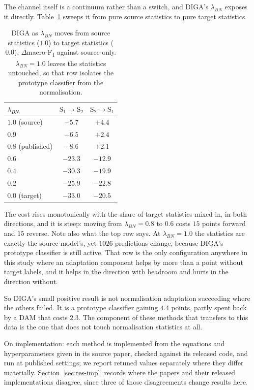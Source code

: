 \documentclass[a4paper,fleqn]{cas-dc}
\newcommand{\macf}{macro-F\textsubscript{1}}
\begin{document}
The channel itself is a continuum rather than a switch, and DIGA's $\lambda_{BN}$ exposes
it directly. Table~\ref{tab:bndial} sweeps it from pure source statistics to pure target
statistics.

\begin{table}[t]
\centering
\caption{DIGA as $\lambda_{BN}$ moves from source statistics ($1.0$) to target statistics
($0.0$), $\Delta$\macf{} against source-only. $\lambda_{BN}=1.0$ leaves the statistics
untouched, so that row isolates the prototype classifier from the normalisation.}
\label{tab:bndial}
\small
\begin{tabular}{@{}lcc@{}}
\toprule
$\lambda_{BN}$ & $\text{S}_1\!\to\!\text{S}_2$ & $\text{S}_2\!\to\!\text{S}_1$ \\
\midrule
$1.0$ (source) & $-5.7$ & $\mathbf{+4.4}$ \\
$0.9$          & $-6.5$ & $+2.4$ \\
$0.8$ (published) & $-8.6$ & $+2.1$ \\
$0.6$          & $-23.3$ & $-12.9$ \\
$0.4$          & $-30.3$ & $-19.9$ \\
$0.2$          & $-25.9$ & $-22.8$ \\
$0.0$ (target) & $-33.0$ & $-20.5$ \\
\bottomrule
\end{tabular}
\end{table}

The cost rises monotonically with the share of target statistics mixed in, in both
directions, and it is steep: moving from $\lambda_{BN}=0.8$ to $0.6$ costs $15$ points
forward and $15$ reverse. Note also what the top row says. At $\lambda_{BN}=1.0$ the
statistics are exactly the source model's, yet $1026$ predictions change, because DIGA's
prototype classifier is still active. That row is the only configuration anywhere in this
study where an adaptation component helps by more than a point without target labels, and
it helps in the direction with headroom and hurts in the direction without.

So DIGA's small positive result is not normalisation adaptation succeeding where the others
failed. It is a prototype classifier gaining $4.4$ points, partly spent back by a DAM that
costs $2.3$. The component of these methods that transfers to this data is the one that
does not touch normalisation statistics at all.

On implementation: each method is implemented from the equations and hyperparameters given
in its source paper, checked against its released code, and run at published settings; we
report retuned values separately where they differ materially. Section~\ref{sec:res-impl}
records where the papers and their released implementations disagree, since three of those
disagreements change results here.
\label{sec:res-mech}
\end{document}
